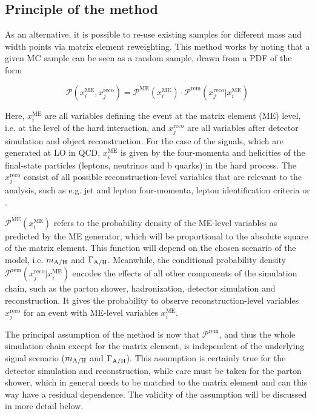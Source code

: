 \subsection{Principle of the method}

As an alternative, it is possible to re-use existing samples for different mass and width points via matrix element reweighting. This method works by noting that a given MC sample can be seen as a random sample, drawn from a PDF of the form

\begin{equation}
\label{eq:ah:merewprob}
    \mathcal{P}(x_i^{\mathrm{ME}}, x_j^{\mathrm{reco}}) = \mathcal{P}^{\mathrm{ME}} (x_i^{\mathrm{ME}}) \cdot \mathcal{P}^{\mathrm{rem}} (x_j^{\mathrm{reco}} | x_i^{\mathrm{ME}})
\end{equation}

Here, $x_i^{\mathrm{ME}}$ are all variables defining the event at the matrix element (ME) level, i.e. at the level of the hard interaction, and $x_j^{\mathrm{reco}}$ are all variables after detector simulation and object reconstruction. For the case of the \AH signals, which are generated at LO in QCD, $x_i^{\mathrm{ME}}$ is given by the four-momenta and helicities of the final-state particles (leptons, neutrinos and b quarks) in the hard process. The $x_j^{\mathrm{reco}}$ consist of all possible reconstruction-level variables that are relevant to the analysis, such as e.g. jet and lepton four-momenta, lepton identification criteria or \ptmissvec. 

$\mathcal{P}^{\mathrm{ME}} (x_i^{\mathrm{ME}})$ refers to the probability density of the ME-level variables as predicted by the ME generator, which will be proportional to the absolute square of the matrix element. This function will depend on the chosen scenario of the \AH model, i.e. $m_{\mathrm{A/H}}$ and $\Gamma_{\mathrm{A/H}}$. Meanwhile, the conditional probability density $\mathcal{P}^{\mathrm{rem}} (x_j^{\mathrm{reco}} | x_i^{\mathrm{ME}})$ encodes the effects of all other components of the simulation chain, such as the parton shower, hadronization, detector simulation and reconstruction. It gives the probability to observe reconstruction-level variables $x_j^{\mathrm{reco}}$ for an event with ME-level variables $x_i^{\mathrm{ME}}$.

The principal assumption of the method is now that $\mathcal{P}^{\mathrm{rem}}$, and thus the whole simulation chain except for the matrix element, is independent of the underlying \AH signal scenario ($m_{\mathrm{A/H}}$ and $\Gamma_{\mathrm{A/H}}$). This assumption is certainly true for the detector simulation and reconstruction, while care must be taken for the parton shower, which in general needs to be matched to the matrix element and can this way have a residual dependence. The validity of the assumption will be discussed in more detail below.

